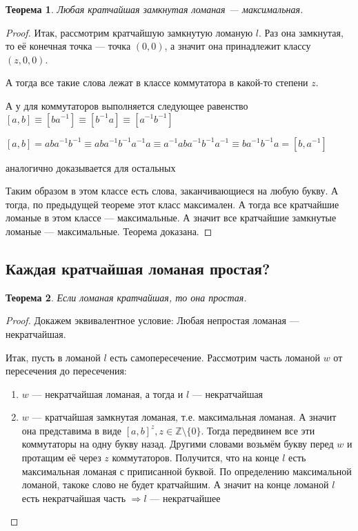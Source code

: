 \documentclass[12pt,a4paper, flushleft]{article}
\newtheorem{Th}{Теорема}[section]
\begin{document}
\begin{Th}
	Любая кратчайшая замкнутая ломаная --- максимальная.
\end{Th}
\begin{proof}
	Итак, рассмотрим кратчайшую замкнутую ломаную $l$. Раз она замкнутая, то её конечная точка --- точка $(0, 0)$, а значит она принадлежит классу $(z, 0, 0)$. 	
	
	А тогда все такие слова лежат в классе коммутатора в какой-то степени $z$.
	
	А у для коммутаторов выполняется следующее равенство $[a, b] \equiv [ba^{-1}] \equiv [b^{-1}a]\equiv [a^{-1}b^{-1}]$
	
	$[a, b] = aba^{-1}b^{-1}\equiv aba^{-1}b^{-1}a^{-1}a\equiv a^{-1}aba^{-1}b^{-1}a^{-1}\equiv ba^{-1}b^{-1}a = [b, a^{-1}]$
	
	аналогично доказывается для остальных
	
	Таким образом в этом классе есть слова, заканчивающиеся на любую букву. А тогда, по предыдущей теореме этот класс максимален. А тогда все кратчайшие ломаные в этом классе --- максимальные. А значит все кратчайшие замкнутые ломаные --- максимальные. Теорема доказана.	
\end{proof}

\subsection{Каждая кратчайшая ломаная простая?}

\begin{Th}
	Если ломаная кратчайшая, то она простая. 
\end{Th}
\begin{proof}
	Докажем эквивалентное условие: Любая непростая ломаная --- некратчайшая.
	
	Итак, пусть в ломаной $l$ есть самопересечение. Рассмотрим часть ломаной  $w$ от пересечения до пересечения:
	\begin{enumerate}
		\item $w$ --- некратчайшая ломаная, а тогда и $l$ --- некратчайшая
		\item $w$ --- кратчайшая замкнутая ломаная, т.е. максимальная ломаная. А значит она представима в виде $[a, b]^z, z\in \mathds{Z}\setminus \{0\}$. Тогда передвинем все эти коммутаторы на одну букву назад. Другими словами возьмём букву перед  $w$ и протащим её через $z$ коммутаторов. Получится, что на конце $l$ есть максимальная ломаная с приписанной буквой. По определению максимальной ломаной, такоке слово не будет кратчайшим. А значит на конце ломаной $l$ есть некратчайшая часть $\Rightarrow l$ --- некратчайшее
	\end{enumerate}
\end{proof}
\end{document}

